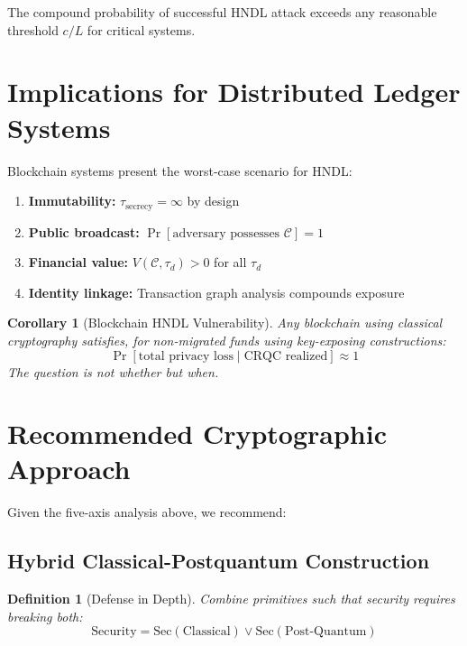 \documentclass[11pt,a4paper]{article}
\newtheorem{corollary}[theorem]{Corollary}
\newtheorem{definition}[theorem]{Definition}
\begin{document}
The compound probability of successful HNDL attack exceeds any reasonable threshold $c/L$ for critical systems.

\section{Implications for Distributed Ledger Systems}

Blockchain systems present the worst-case scenario for HNDL:

\begin{enumerate}[noitemsep]
    \item \textbf{Immutability:} $\tau_{\text{secrecy}} = \infty$ by design
    \item \textbf{Public broadcast:} $\Pr[\text{adversary possesses } \mathcal{C}] = 1$
    \item \textbf{Financial value:} $V(\mathcal{C}, \tau_d) > 0$ for all $\tau_d$
    \item \textbf{Identity linkage:} Transaction graph analysis compounds exposure
\end{enumerate}

\begin{corollary}[Blockchain HNDL Vulnerability]
Any blockchain using classical cryptography satisfies, for non-migrated funds using key-exposing constructions:
\begin{equation}
\Pr[\text{total privacy loss} \mid \text{CRQC realized}] \approx 1
\end{equation}
The question is not \textit{whether} but \textit{when}.
\end{corollary}

\section{Recommended Cryptographic Approach}

Given the five-axis analysis above, we recommend:

\subsection{Hybrid Classical-Postquantum Construction}

\begin{definition}[Defense in Depth]
Combine primitives such that security requires breaking \textit{both}:
\begin{equation}
\text{Security} = \text{Sec}(\text{Classical}) \lor \text{Sec}(\text{Post-Quantum})
\end{equation}
\end{definition}
\end{document}
